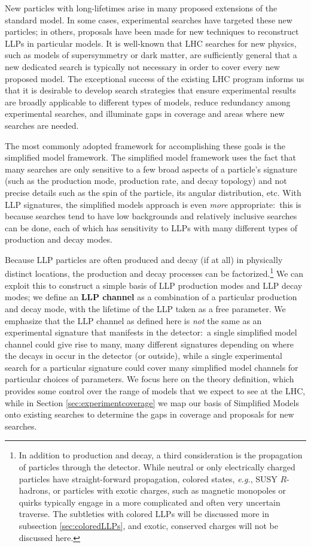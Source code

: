 

New particles with long-lifetimes arise in many proposed extensions of the standard model.  In some cases, experimental searches have targeted these new particles; in others, proposals have been made for new techniques to reconstruct LLPs in particular models.  
It is well-known that LHC searches for new physics, such as models of supersymmetry or dark matter, are sufficiently general that a new dedicated search is typically not necessary in order to cover every new proposed model.  The exceptional success of the existing LHC program informs us that it is desirable to develop search strategies that ensure experimental results are broadly applicable to different types of models, reduce redundancy among experimental searches, and illuminate gaps in coverage and areas where new searches are needed. 

The most commonly adopted framework for accomplishing these goals is the simplified model framework. The simplified model framework uses the fact that many searches are only sensitive to a few broad aspects of a particle's signature (such as the production mode, production rate, and decay topology) and not precise details such as the spin of the particle, its angular distribution, etc. With LLP signatures, the simplified models approach is even \emph{more} appropriate:~this is because searches tend to have low backgrounds and relatively inclusive searches can be done, each of which has sensitivity to LLPs with many different types of production and decay modes.


Because LLP particles are often produced and decay (if at all) in physically distinct locations, the production and decay processes can be factorized.\footnote{In addition to production and decay, a third consideration is the propagation of particles through the detector.  While neutral or only electrically charged particles have straight-forward propagation, colored states, \emph{e.g.}, SUSY $R$-hadrons, or particles with exotic charges, such as magnetic monopoles or quirks typically engage in a more complicated and often very uncertain traverse.  The subtleties with colored LLPs will be discussed more in subsection \ref{sec:coloredLLPs}, and exotic, conserved charges will not be discussed here.}  
We can exploit this to construct a simple basis of LLP production modes and LLP decay modes; we define an {\bf LLP channel} as a combination of a particular production and decay mode, with the lifetime of the LLP taken as a free parameter. We emphasize that the LLP channel as defined here is \emph{not} the same as an experimental signature that manifests in the detector:~a single simplified model channel could give rise to many, many different signatures depending on where the decays in occur in the detector (or outside), while a single experimental search for a particular signature could cover many simplified model channels for particular choices of parameters. We focus here on the theory definition, which provides some control over the range of models that we expect to see at the LHC, while in Section \ref{sec:experimentcoverage} we map our basis of Simplified Models onto existing searches to determine the gaps in coverage and proposals for new searches.

